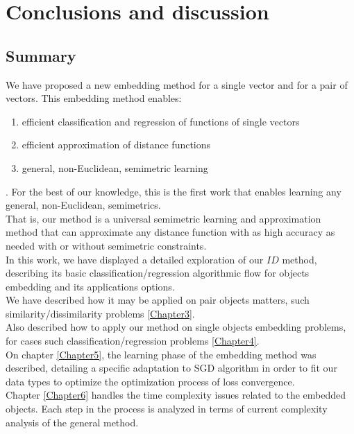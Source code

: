 
\chapter{Conclusions and discussion} %

\label{Chapter9} 

\section{Summary}

We have proposed a new embedding method for a single vector and for a pair
of vectors. This embedding method enables: 
\begin{enumerate}
	\item efficient classification and regression of functions of single vectors
	\item efficient approximation of distance functions
	\item general, non-Euclidean, semimetric learning
\end{enumerate}.
For the best of our knowledge, this is the first work that enables learning any general, non-Euclidean, semimetrics.\\ 
That is, our method is a universal semimetric learning and approximation method that can approximate any distance function with as high accuracy as needed with or without semimetric constraints.\\
In this work, we have displayed a detailed exploration of our $ID$ method, describing its basic classification/regression algorithmic flow for objects embedding and its applications options.\\

We have described how it may be applied on pair objects matters, such similarity/dissimilarity problems \ref{Chapter3}.\\

Also described how to apply our method on single objects embedding problems, for cases such classification/regression problems \ref{Chapter4}.\\

On chapter \ref{Chapter5}, the learning phase of the embedding method was described, detailing a specific adaptation to SGD \cite{SGD} algorithm in order to fit our data types to optimize the optimization process of loss convergence.\\

Chapter \ref{Chapter6} handles the time complexity issues related to the embedded objects. Each step in the process is analyzed in terms of current complexity analysis of the general method.\\


